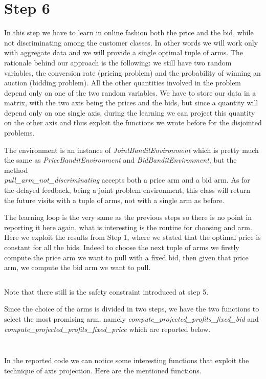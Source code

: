 \documentclass[11pt]{article} %
\begin{document}
\section{Step 6}
In this step we have to learn in online fashion both the price and the bid, while not discriminating among the customer
classes. In other words we will work only with aggregate data and we will provide a single optimal tuple of arms.
The rationale behind our approach is the following: we still have two random variables, the conversion rate (pricing
problem) and the probability of winning an auction (bidding problem). All the other quantities involved in the problem
depend only on one of the two random variables. We have to store our data in a matrix, with the two axis being the prices
and the bids, but since a quantity will depend only on one single axis, during the learning we can project this quantity
on the other axis and thus exploit the functions we wrote before for the disjointed problems.

The environment is an instance of \textit{JointBanditEnvironment} which is pretty much the same as \textit{PriceBanditEnvironment}
and \textit{BidBanditEnvironment}, but the method \\ \textit{pull\_arm\_not\_discriminating} accepts both a price arm and a
bid arm.
As for the delayed feedback, being a joint problem environment, this class will return the future visits with a tuple of
arms, not with a single arm as before.

The learning loop is the very same as the previous steps so there is no point in reporting it here again, what is
interesting is the routine for choosing and arm. Here we exploit the results from Step 1, where we stated that the optimal
price is constant for all the bids. Indeed to choose the next tuple of arms we firstly compute the price arm we want to
pull with a fixed bid, then given that price arm, we compute the bid arm we want to pull.
\inputminted{python}{code/step6_choose_arm.py}
Note that there still is the safety constraint introduced at step 5.

Since the choice of the arms is divided in two steps, we have the two functions to select the most promising arm, namely
\textit{compute\_projected\_profits\_fixed\_bid} and \textit{compute\_projected\_profits\_fixed\_price} which are reported below.
\inputminted{python}{code/step6_expected_price_fixed_bid.py}
\inputminted{python}{code/step6_expected_price_fixed_price.py}

In the reported code we can notice some interesting functions that exploit the technique of axis projection. Here are the
mentioned functions.
\inputminted{python}{code/step6_axis_projected_quantities.py}
\end{document}
